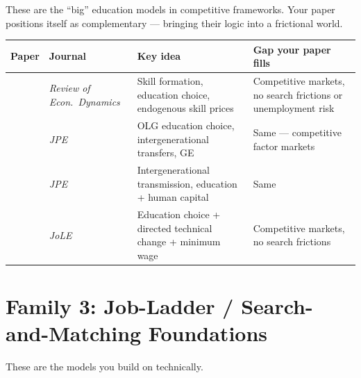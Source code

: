 \documentclass[12pt]{article}
\begin{document}
These are the ``big'' education models in competitive frameworks. Your paper positions itself as complementary --- bringing their logic into a frictional world.

\begin{longtable}{p{4cm} p{3.5cm} p{3.5cm} p{3cm}}
\toprule
\textbf{Paper} & \textbf{Journal} & \textbf{Key idea} & \textbf{Gap your paper fills} \\
\midrule
\endhead
\citet{heckman1998} & \emph{Review of Econ.\ Dynamics} & Skill formation, education choice, endogenous skill prices & Competitive markets, no search frictions or unemployment risk \\[6pt]
\citet{abbott2019} & \emph{JPE} & OLG education choice, intergenerational transfers, GE & Same --- competitive factor markets \\[6pt]
\citet{lee2019} & \emph{JPE} & Intergenerational transmission, education + human capital & Same \\[6pt]
\citet{barany2016} & \emph{JoLE} & Education choice + directed technical change + minimum wage & Competitive markets, no search frictions \\
\bottomrule
\end{longtable}


\section{Family 3: Job-Ladder / Search-and-Matching Foundations}

These are the models you build on technically.
\end{document}
